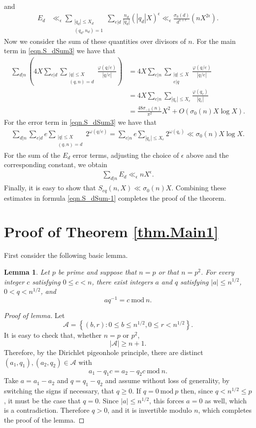 \documentclass[reqno]{amsart}
\newcommand{\mc}{\mathcal}
\newtheorem{lemma}[theorem]{Lemma}
\begin{document}
and
\begin{align*}
	E_d&\ll_\epsilon \sum_{\substack{|q_d|\le X_d\\(q_d,n_d)=1}}\sum_{e|d}\frac{n_d}{|q_d|}\left(|q_d|X\right)^\epsilon\ll_\epsilon \frac{\sigma_0(d)}{d^{1+\epsilon}}\left(nX^{2\epsilon}\right).
\end{align*}
Now we consider the sum of these quantities over divisors of $n$. For the main term in \eqref{eqn.S_dSum3} we have that
\begin{align*}
	\sum_{d|n}\left(4X\sum_{e|d}\sum_{\substack{|q|\le X\\(q,n)=d}}\frac{\varphi(q/e)}{|q/e|}\right)&=4X\sum_{e|n}\sum_{\substack{|q|\le X\\e|q}}\frac{\varphi(q/e)}{|q/e|}\\
	&=4X\sum_{e|n}\sum_{|q_e|\le X_e}\frac{\varphi(q_e)}{|q_e|}\\
	&=\frac{48\sigma_{-1}(n)}{\pi^2}X^2+O\left(\sigma_0(n)X\log X\right).
\end{align*}
For the error term in \eqref{eqn.S_dSum3} we have that
\begin{align*}
	\sum_{d|n}\sum_{e|d}e\sum_{\substack{|q|\le X\\(q,n)=d}}2^{\omega(q/e)}=\sum_{e|n}e\sum_{|q_e|\le X_e}2^{\omega(q_e)}\ll \sigma_0(n)X\log X.
\end{align*}
For the sum of the $E_d$ error terms, adjusting the choice of $\epsilon$ above and the corresponding constant, we obtain
\begin{align*}
	\sum_{d|n}E_d\ll_\epsilon nX^\epsilon.
\end{align*}
Finally, it is easy to show that $S_{eq}(n,X)\ll \sigma_0(n)X$. Combining these estimates in formula  \eqref{eqn.S_dSum-1} completes the proof of the theorem.

\section{Proof of Theorem \ref{thm.Main1}}
First consider the following basic lemma.
\begin{lemma}\label{lem.p-adic1}
Let $p$ be prime and suppose that $n=p$ or that $n=p^2$. For every integer $c$ satisfying $0\le c< n$, there exist integers $a$ and $q$ satisfying $|a|\le n^{1/2}$, $0<q< n^{1/2}$, and
\[aq^{-1}=c ~\mathrm{mod}~ n.\]
\end{lemma}
\begin{proof}[Proof of lemma]
Let
\[\mc{A}=\left\{(b,r): 0\le b\le n^{1/2}, 0\le r<n^{1/2}\right\}.\]
It is easy to check that, whether $n=p$ or $p^2$,
\[|\mc{A}|\ge n+1.\]
Therefore, by the Dirichlet pigeonhole principle, there are distinct $(a_1,q_1),(a_2,q_2)\in\mc{A}$ with
\[a_1-q_1c=a_2-q_2c~\mathrm{mod}~n.\]
Take $a=a_1-a_2$ and $q=q_1-q_2$ and assume without loss of generality, by switching the signs if necessary, that $q\ge 0$. If $q=0~\mathrm{mod}~p$ then, since $q<n^{1/2}\le p$, it must be the case that $q=0$. Since $|a|\le n^{1/2}$, this forces $a=0$ as well, which is a contradiction. Therefore $q>0$, and it is invertible modulo $n$, which completes the proof of the lemma.
\end{proof}
\end{document}
